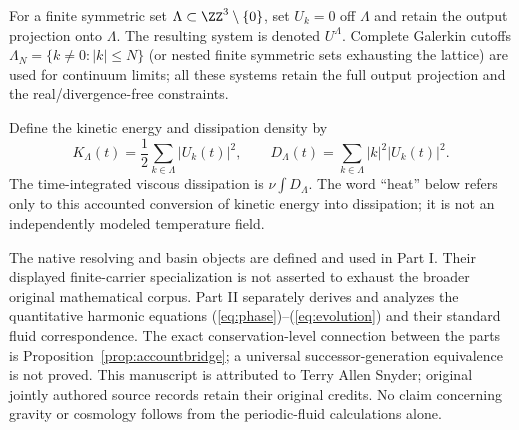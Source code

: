For a finite symmetric set $\Lambda\subset\ZZ^3\setminus\{0\}$, set $U_k=0$ off $\Lambda$ and retain the output projection onto $\Lambda$. The resulting system is denoted $U^{\Lambda}$. Complete Galerkin cutoffs $\Lambda_N=\{k\ne0:|k|\le N\}$ (or nested finite symmetric sets exhausting the lattice) are used for continuum limits; all these systems retain the full output projection and the real/divergence-free constraints.

Define the kinetic energy and dissipation density by
\begin{equation}\label{eq:energydef}
K_\Lambda(t)=\frac12\sum_{k\in\Lambda}|U_k(t)|^2,
\qquad D_\Lambda(t)=\sum_{k\in\Lambda}|k|^2|U_k(t)|^2.
\end{equation}
The time-integrated viscous dissipation is $\nu\int D_\Lambda$. The word ``heat'' below refers only to this accounted conversion of kinetic energy into dissipation; it is not an independently modeled temperature field.

\begin{remark}
The native resolving and basin objects are defined and used in Part I. Their displayed finite-carrier specialization is not asserted to exhaust the broader original mathematical corpus. Part II separately derives and analyzes the quantitative harmonic equations (\ref{eq:phase})--(\ref{eq:evolution}) and their standard fluid correspondence. The exact conservation-level connection between the parts is Proposition~\ref{prop:accountbridge}; a universal successor-generation equivalence is not proved. This manuscript is attributed to Terry Allen Snyder; original jointly authored source records retain their original credits. No claim concerning gravity or cosmology follows from the periodic-fluid calculations alone.
\end{remark}

